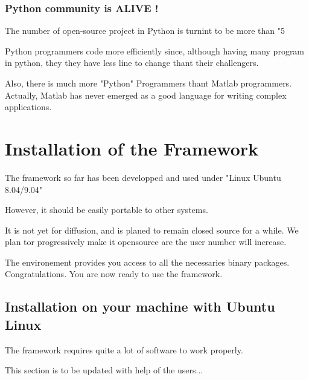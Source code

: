 \documentclass{report}
\begin{document}
\subsection{Python community is ALIVE !}
The number of open-source project in Python is turnint to be more than "5%










Python programmers code more efficiently since, although having many program in python, 
they they have less line to change thant their challengers.






Also, there is much more "Python" Programmers thant Matlab programmers.
Actually, Matlab has never emerged as a good language for writing complex applications.














\chapter{Installation of the Framework}
The framework so far has been developped and used under "Linux Ubuntu 8.04/9.04"


However, it should be easily portable to other systems.


It is not yet for diffusion, and is planed to remain closed source for a while.
We plan tor progressively make it opensource are the user number will increase.



The environement provides you access to all the necessaries binary packages.
Congratulations. You are now ready to use the framework.




\section{Installation on your machine with Ubuntu Linux}
The framework requires quite a lot of software to work properly.

This section is to be updated with help of the users...
\end{document}
